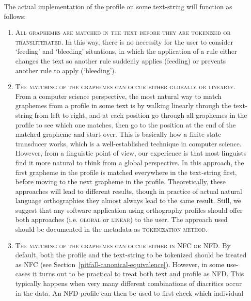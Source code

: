 \noindent The actual implementation of the profile on some text-string will function as
follows:

\begin{enumerate}
	\def\labelenumi{B\arabic{enumi}.} \setcounter{enumi}{4} 
	\item \textsc{All graphemes are matched in the text before they are tokenized
       or transliterated}. In this way, there is no necessity for the user to
       consider `feeding' and `bleeding' situations, in which the application of
       a rule either changes the text so another rule suddenly applies (feeding)
       or prevents another rule to apply (`bleeding'). 
	\item \textsc{The matching of the graphemes can occur either globally or
       linearly. }From a computer science perspective, the most natural way to
       match graphemes from a profile in some text is by walking linearly
       through the text-string from left to right, and at each position go
       through all graphemes in the profile to see which one matches, then go to
       the position at the end of the matched grapheme and start over. This is
       basically how a finite state transducer works, which is a
       well-established technique in computer science. However, from a
       linguistic point of view, our experience is that most linguists find it
       more natural to think from a global perspective. In this approach, the
       first grapheme in the profile is matched everywhere in the text-string
       first, before moving to the next grapheme in the profile. Theoretically,
       these approaches will lead to different results, though in practice of
       actual natural language orthographies they almost always lead to the same
       result. Still, we suggest that any software application using orthography
       profiles should offer both approaches (i.e. \textsc{global} or
       \textsc{linear}) to the user. The approach used should be documented in
       the metadata as \textsc{tokenization method}. 
	\item \textsc{The matching of the graphemes can occur either in NFC or NFD.} By
       default, both the profile and the text-string to be tokenized should be
       treated as NFC (see Section~\ref{pitfall-canonical-equivalence}). However, in some use-cases it turns out to
       be practical to treat both text and profile as NFD. This typically
       happens when very many different combinations of diacritics occur in the
       data. An NFD-profile can then be used to first check which individual

\end{enumerate}
